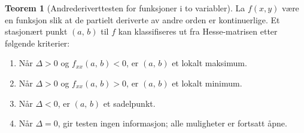 \documentclass[11pt]{article}
\theoremstyle{definition}
\theoremstyle{definition}
\theoremstyle{definition}
\theoremstyle{definition}
\newtheorem{teo}{Teorem}[section]
\newenvironment{fteo}
{\begin{mdframed}[style=minstil]\begin{teo}}
		{\end{teo}\end{mdframed}}
\theoremstyle{definition}
\theoremstyle{definition}
\begin{document}
\begin{fteo}[Andrederiverttesten for funksjoner i to variabler]
	La \(f(x,y)\) være en funksjon slik at de partielt deriverte av andre orden er kontinuerlige. Et stasjonært punkt \((a,\,b) \) til \(f\) kan klassifiseres ut fra Hesse-matrisen etter følgende kriterier:
	\begin{enumerate}
		\item Når \(\Delta >0 \) og \(f_{xx}(a,\,b) <0\),  er \((a,\,b) \) et lokalt maksimum.
		\item Når \(\Delta>0 \) og \(f_{xx}(a,\,b)>0 \), er \((a,\,b) \) et lokalt minimum.
		\item Når \(\Delta < 0  \), er \((a,\,b)\) et sadelpunkt.
		\item Når \(\Delta =0 \), gir testen ingen informasjon; alle muligheter er fortsatt åpne.
	\end{enumerate}
\end{fteo}
	
\end{document}

